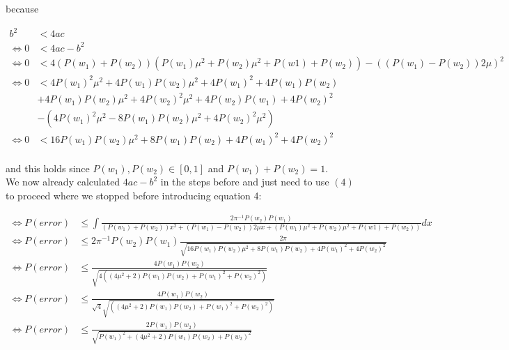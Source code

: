 \documentclass[10pt,a4paper]{article}
\begin{document}
because

\begin{align*}
    b^2 &< 4ac \\
    \Leftrightarrow 0 &< 4ac-b^2 \\
    \Leftrightarrow 0 &< 4(P(w_1)+P(w_2))(P(w_1)\mu^2 + P(w_2)\mu^2+P(w1)+P(w_2))-((P(w_1)-P(w_2))2\mu)^2 \\
    \Leftrightarrow 0 &< 4P(w_1)^2\mu^2 + 4P(w_1)P(w_2)\mu^2+4P(w_1)^2+4P(w_1)P(w_2) \\
    &+ 4P(w_1)P(w_2)\mu^2+4P(w_2)^2\mu^2+ 4P(w_2)P(w_1)+4P(w_2)^2 \\
    &- (4P(w_1)^2\mu^2-8P(w_1)P(w_2)\mu^2+4P(w_2)^2\mu^2) \\
    \Leftrightarrow 0 &< 16P(w_1)P(w_2)\mu^2+8P(w_1)P(w_2)+4P(w_1)^2+4P(w_2)^2 \\
\end{align*}

and this holds since $P(w_1), P(w_2) \in [0,1]$ and $P(w_1) + P(w_2) = 1$.\\
We now already calculated $4ac-b^2$ in the steps before and just need to use $(4)$ to proceed where we stopped before introducing equation 4:

\begin{align*}
    \Leftrightarrow P(error) &\le \int \frac{2 \pi^{-1} P(w_2) P(w_1)}{(P(w_1)+P(w_2))x^2 + (P(w_1)-P(w_2))2\mu x + (P(w_1)\mu^2 + P(w_2)\mu^2+P(w1)+P(w_2))}dx \\
    \Leftrightarrow P(error) &\le 2 \pi^{-1} P(w_2) P(w_1) \frac{2\pi}{\sqrt{16P(w_1)P(w_2)\mu^2+8P(w_1)P(w_2)+4P(w_1)^2+4P(w_2)^2}} \\
    \Leftrightarrow P(error) &\le \frac{4 P(w_1) P(w_2) }{\sqrt{4((4\mu^2+2)P(w_1)P(w_2)+P(w_1)^2+P(w_2)^2)}} \\
    \Leftrightarrow P(error) &\le \frac{4 P(w_1) P(w_2) }{\sqrt{4}\sqrt{((4\mu^2+2)P(w_1)P(w_2)+P(w_1)^2+P(w_2)^2)}} \\
    \Leftrightarrow P(error) &\le \frac{2 P(w_1) P(w_2) }{\sqrt{P(w_1)^2+(4\mu^2+2)P(w_1)P(w_2)+P(w_2)^2}} \\
\end{align*}
\end{document}
